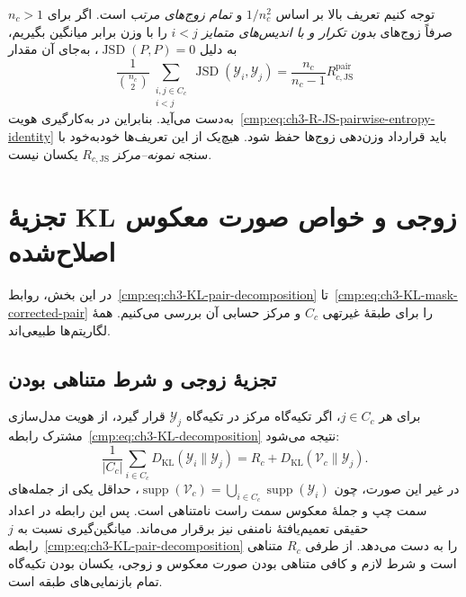 توجه کنیم تعریف بالا بر اساس
$1/n_c^2$ و \emph{تمام زوج‌های مرتب}
است. اگر برای $n_c>1$ صرفاً زوج‌های
\emph{بدون تکرار و با اندیس‌های متمایز}
$i<j$ را با وزن برابر میانگین بگیریم،
به دلیل $\operatorname{JSD}(P,P)=0$،
به‌جای آن مقدار
\[
\frac{1}{\binom{n_c}{2}}
\sum_{\substack{i,j\in C_c\\i<j}}
\operatorname{JSD}(\mathscr Y_i,\mathscr Y_j)
=\frac{n_c}{n_c-1}
R_{c,\mathrm{JS}}^{\mathrm{pair}}
\]
به‌دست می‌آید. بنابراین در
به‌کارگیری هویت~\eqref{cmp:eq:ch3-R-JS-pairwise-entropy-identity}
باید قرارداد وزن‌دهی زوج‌ها
حفظ شود. هیچ‌یک از این تعریف‌ها
خودبه‌خود با سنجه \emph{نمونه--مرکز}
$R_{c,\mathrm{JS}}$
یکسان نیست.


\section{تجزیهٔ KL زوجی و خواص صورت معکوس اصلاح‌شده}
\label{app:geometry-KL-pair-mask}

در این بخش، روابط~\eqref{cmp:eq:ch3-KL-pair-decomposition}
تا~\eqref{cmp:eq:ch3-KL-mask-corrected-pair} را برای
طبقهٔ غیرتهی $C_c$ و مرکز حسابی آن بررسی می‌کنیم.
همهٔ لگاریتم‌ها طبیعی‌اند.

\subsection{تجزیهٔ زوجی و شرط متناهی بودن}
برای هر $j\in C_c$، اگر تکیه‌گاه مرکز در تکیه‌گاه
$\mathscr Y_j$ قرار گیرد، از هویت مدل‌سازی مشترک
رابطه~\eqref{cmp:eq:ch3-KL-decomposition} نتیجه می‌شود:
\[
\frac1{|C_c|}\sum_{i\in C_c}D_{\mathrm{KL}}(\mathscr Y_i\|\mathscr Y_j)
=R_c+D_{\mathrm{KL}}(\mathcal V_c\|\mathscr Y_j).
\]
در غیر این صورت، چون
$\operatorname{supp}(\mathcal V_c)
=\bigcup_{i\in C_c}\operatorname{supp}(\mathscr Y_i)$،
حداقل یکی از جمله‌های سمت چپ و جملهٔ معکوس سمت راست
نامتناهی است. پس این رابطه در اعداد حقیقی تعمیم‌یافتهٔ
نامنفی نیز برقرار می‌ماند. میانگین‌گیری نسبت به $j$
رابطه~\eqref{cmp:eq:ch3-KL-pair-decomposition} را به دست
می‌دهد. از طرفی $R_c$ متناهی است و شرط لازم و کافی
متناهی بودن صورت معکوس و زوجی، یکسان بودن تکیه‌گاه
تمام بازنمایی‌های طبقه است.


